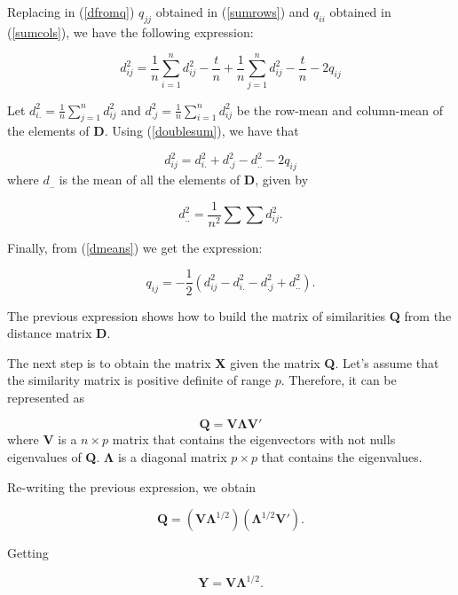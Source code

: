 \documentclass[11pt]{report}
\begin{document}
\indent Replacing in (\ref{dfromq}) $q_{jj}$ obtained in (\ref{sumrows}) and $q_{ii}$
obtained in (\ref{sumcols}), we have the following expression:

\begin{equation} \label{generaldij}
d_{ij}^2 = \frac{1}{n}\sum_{i = 1}^n d_{ij}^2 - \frac{t}{n} + \frac{1}{n} \sum_{j = 1}^n d_{ij}^2 -\frac{t}{n} -2q_{ij}
\end{equation}

\indent Let $d_{i.}^2 = \frac{1}{n}\sum_{j = 1}^n d_{ij}^2$ and $d_{.j}^2 = \frac{1}{n}\sum_{i=1}^n d_{ij}^2$ 
be the row-mean and column-mean of the elements of \textbf{D}. Using 
(\ref{doublesum}), we have that

\begin{equation} \label{dmeans}
d_{ij}^2 = d_{i.}^2 + d_{.j}^2 - d_{..}^2-2q_{ij}
\end{equation}
where $d_{..}$ is the mean of all the elements of \textbf{D}, given by

\[
d_{..}^2 = \frac{1}{n^2}\sum \sum d_{ij}^2.
\]

\indent Finally, from (\ref{dmeans}) we get the expression:

\begin{equation} \label{qij2}
q_{ij} = -\frac{1}{2}(d_{ij}^2 - d_{i.}^2 - d_{.j}^2 + d_{..}^2).
\end{equation}

\indent The previous expression shows how to build the matrix of similarities 
\textbf{Q} from the distance matrix \textbf{D}.

\indent The next step is to obtain the matrix \textbf{X} given the matrix 
\textbf{Q}. Let's assume that the similarity matrix is positive definite of 
range $p$. Therefore, it can be represented as

\[
\mathbf{Q} = \mathbf{V}\mathbf{\Lambda}\mathbf{V'}
\]
where $\mathbf{V}$ is a $n \times p$ matrix that contains the eigenvectors with
not nulls eigenvalues of \textbf{Q}. $\mathbf{\Lambda}$ is a diagonal matrix 
$p \times p$ that contains the eigenvalues.

\indent Re-writing the previous expression, we obtain

\begin{equation} \label{generalQ}
\mathbf{Q} = (\mathbf{V}\mathbf{\Lambda}^{1/2})(\mathbf{\Lambda}^{1/2}\mathbf{V'}).
\end{equation}

Getting

\[
\mathbf{Y} = \mathbf{V}\mathbf{\Lambda}^{1/2}.
\]
\end{document}
